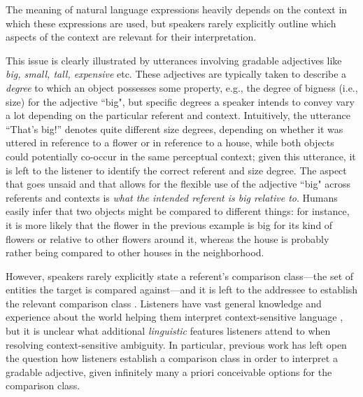 The meaning of natural language expressions heavily depends on the context in which these expressions are used, but speakers rarely explicitly outline which aspects of the context are relevant for their interpretation. 

This issue is clearly illustrated by utterances involving gradable adjectives like \textit{big, small, tall, expensive} etc. These adjectives are typically taken to describe a \emph{degree} to which an object possesses some property, e.g., the degree of bigness (i.e., size) for the adjective ``big", but specific degrees a speaker intends to convey vary a lot depending on the particular referent and context. Intuitively, the utterance “That’s big!” denotes quite different size degrees, depending on whether it was uttered in reference to a flower or in reference to a house, while both objects could potentially co-occur in the same perceptual context; given this utterance, it is left to the listener to identify the correct referent and size degree. The aspect that goes unsaid and that allows for the flexible use of the adjective ``big" across referents and contexts is \textit{what the intended referent is big relative to}. Humans easily infer that two objects might be compared to different things: for instance, it is more likely that the flower in the previous example is big for its kind of flowers or relative to other flowers around it, whereas the house is probably rather being compared to other houses in the neighborhood. 

However, speakers rarely explicitly state a referent's comparison class---the set of entities the target is compared against---and it is left to the addressee to establish the relevant comparison class \parencite{Solt2009}. Listeners have vast general knowledge and experience about the world helping them interpret context-sensitive language \parencite{tessler2017warm}, but it is unclear what additional \emph{linguistic} features listeners attend to when resolving context-sensitive ambiguity. 
In particular, previous work has left open the question how listeners establish a comparison class in order to interpret a gradable adjective, given infinitely many a priori conceivable options for the comparison class.

